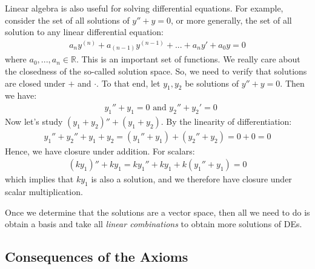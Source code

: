 \documentclass[11pt]{scrartcl}
\newcommand{\R}[0]{\mathbb{R}}
\theoremstyle{definition}
\theoremstyle{remark}
\begin{document}
Linear algebra is also useful for solving differential equations. For example, consider the set of all solutions of $y'' + y = 0$, or more generally, the set of all solution to any linear differential equation: 
\begin{align*}
	a_n y^{(n)} + a_{(n-1)}y^{(n-1)} + ... + a_ny' + a_0 y = 0 	
\end{align*}
where $a_0, ..., a_n \in \R$. This is an important set of functions. We really care about the closedness of the so-called solution space. So, we need to verify that solutions are closed under $+$ and $\cdot$. To that end, let $y_1, y_2$ be solutions of $y'' + y = 0$. Then we have: 
\begin{align*}
	& y_1'' + y_1 = 0 \text{ and } y_2'' + y_2 ' = 0 	
\end{align*}
Now let's study $(y_1 + y_2)'' + (y_1 + y_2)$. By the linearity of differentiation: 
\begin{align*}
	y_1 '' + y_2 '' + y_1 + y_2 = (y_1'' + y_1) + (y_2'' + y_2) = 0 + 0 = 0 	
\end{align*}
Hence, we have closure under addition. For scalars: 
\begin{align*}
	(ky_1)'' + ky_1 = ky_1'' +ky_1 + k(y_1'' + y_1) = 0 	
\end{align*}
which implies that $ky_1$ is also a solution, and we therefore have closure under scalar multiplication. 

Once we determine that the solutions are a vector space, then all we need to do is obtain a basis and take all \emph{linear combinations} to obtain more solutions of DEs. 

\subsection{Consequences of the Axioms}
\end{document}
